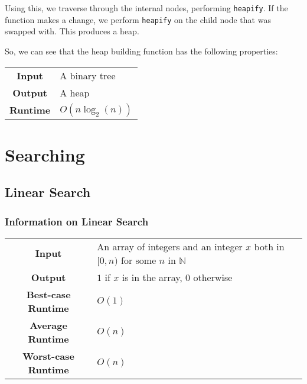 \documentclass[a4paper, 12pt, twoside]{article}
\begin{document}
Using this, we traverse through the internal nodes, performing
\texttt{heapify}. If the function makes a change, we perform
\texttt{heapify} on the child node that was swapped with.
This produces a heap.

\vspace{\baselineskip}

So, we can see that the heap building function has the following
properties:

\begin{center}
      \begin{tabular}{ || c | p{8.5cm} || }
            \hline
                  \textbf{Input} & A binary tree \\
                  \textbf{Output} & A heap \\
            \hline\hline
                  \textbf{Runtime} & $O(n\log_2(n))$ \\
            \hline
      \end{tabular}
\end{center}

\newpage

\section{Searching}

\subsection{Linear Search}

\subsubsection{Information on Linear Search}

\begin{center}
      \begin{tabular}{ || c | p{8.5cm} || }
            \hline
                  \textbf{Input} & An array of integers and an integer
                        $x$ both in $[0, n)$ for some $n$ in $\mathbb{N}$ \\
                  \textbf{Output} & $1$ if $x$ is in the array, $0$
                        otherwise \\
            \hline\hline
                  \textbf{Best-case Runtime} & $O(1)$ \\
                  \textbf{Average Runtime} & $O(n)$ \\
                  \textbf{Worst-case Runtime} & $O(n)$ \\
            \hline
      \end{tabular}
\end{center}
\end{document}
